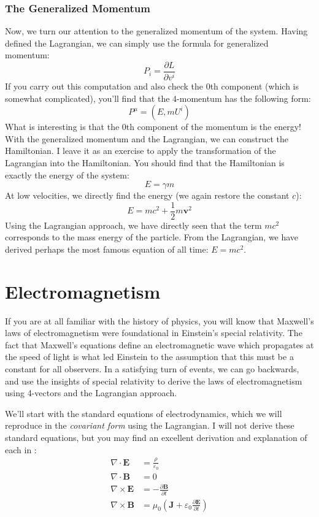\subsubsection{The Generalized Momentum}
Now, we turn our attention to the generalized momentum of the system. Having defined the \gls{Lagrangian}, we can simply use the formula for generalized momentum:
$$P_i=\frac{\partial L}{\partial {v}^i}$$
If you carry out this computation and also check the 0th component (which is somewhat complicated), you'll find that the 4-momentum has the following form:
$$P^\mu=\left(E,mU^i\right)$$
What is interesting is that the 0th component of the momentum is the energy! With the generalized momentum and the \gls{Lagrangian}, we can construct the Hamiltonian. I leave it as an exercise to apply the transformation of the \gls{Lagrangian} into the Hamiltonian. You should find that the Hamiltonian is exactly the energy of the system:
$$E=\gamma m$$
At low velocities, we directly find the energy (we again restore the constant $c$):
$$E=mc^2+\frac{1}{2}m\bm{v}^2$$
Using the \gls{Lagrangian} approach, we have directly seen that the term $mc^2$ corresponds to the mass energy of the particle. From the \gls{Lagrangian}, we have derived perhaps the most famous equation of all time: $E=mc^2$.


\section{Electromagnetism}
If you are at all familiar with the history of physics, you will know that Maxwell's laws of electromagnetism were foundational in Einstein's special relativity. The fact that Maxwell's equations define an electromagnetic wave which propagates at the speed of light is what led Einstein to the assumption that this must be a constant for all observers. In a satisfying turn of events, we can go backwards, and use the insights of special relativity to derive the laws of electromagnetism using 4-vectors and the \gls{Lagrangian} approach.

We'll start with the standard equations of electrodynamics, which we will reproduce in the \textit{covariant form} using the \gls{Lagrangian}. I will not derive these standard equations, but you may find an excellent derivation and explanation of each in \cite{griffiths_introduction_2024}:
\begin{align}
    \nabla\cdot \bm{E}&=\frac{\rho}{\varepsilon_0}\\
    \nabla\cdot\bm{B}&=0\\
    \nabla\times\bm{E}&=-\frac{\partial \bm{B}}{\partial t}\\
    \nabla\times\bm{B}&=\mu_0\left(\bm{J}+\varepsilon_0\frac{\partial\bm{E}}{\partial t}\right)
\end{align}

